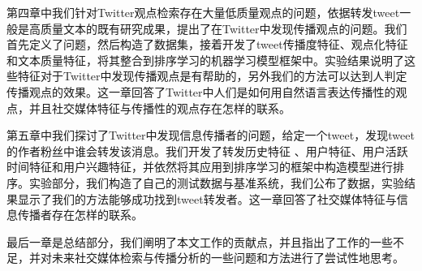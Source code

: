第四章中我们针对Twitter观点检索存在大量低质量观点的问题，依据转发tweet一般是高质量文本的既有研究成果，提出了在Twitter中发现传播观点的问题。我们首先定义了问题，然后构造了数据集，接着开发了tweet传播度特征、观点化特征和文本质量特征，将其整合到排序学习的机器学习模型框架中。实验结果说明了这些特征对于Twitter中发现传播观点是有帮助的，另外我们的方法可以达到人判定传播观点的效果。这一章回答了Twitter中人们是如何用自然语言表达传播性的观点，并且社交媒体特征与传播性的观点存在怎样的联系。

第五章中我们探讨了Twitter中发现信息传播者的问题，给定一个tweet，发现tweet的作者粉丝中谁会转发该消息。我们开发了转发历史特征 、用户特征、用户活跃时间特征和用户兴趣特征，并依然将其应用到排序学习的框架中构造模型进行排序。实验部分，我们构造了自己的测试数据与基准系统，我们公布了数据，实验结果显示了我们的方法能够成功找到tweet转发者。这一章回答了社交媒体特征与信息传播者存在怎样的联系。

最后一章是总结部分，我们阐明了本文工作的贡献点，并且指出了工作的一些不足，并对未来社交媒体检索与传播分析的一些问题和方法进行了尝试性地思考。


